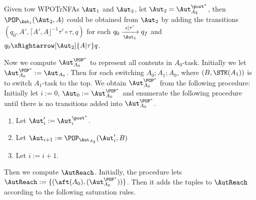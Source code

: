 \begin{theorem}
    Given tow WPOTrNFAs $\Aut_1$ and $\Aut_2$, 
let $\Aut_2 = \Aut_{A_2}^{\post^*}$, then $\POP_{\Aut_1}(\Aut_2,A)$ could be obtained from $\Aut_2$ by adding the transitions $(q_0,A',\lceil A',A\rfloor^{-1}\tau'\circ\tau,q)$ for each $q_0\xrightarrow[\Aut_1]{\epsilon | \tau'} q_f$ and $q_0\xRightarrow[\Aut_2]{A | \tau} q$.
\end{theorem}

Now we compute $\Aut_{A_0}^{\POP^*}$ to represent all contents in $A_0$-task. Initially we let $\Aut_{A_0}^{\POP^*} := \Aut_{A_0}$. Then for each switching $A_0;A_1;A_0$, where $(B,\STK(A_1))$ is to switch $A_1$-task to the top.
We obtain $\Aut_{A_0}^{\POP^*}$ from the following procedure:\\
Initially let $i := 0$, $\Aut_0 := \Aut_{A_0}^{\POP^*}$ and enumerate the following procedure until there is no transitions added into $\Aut_{A_0}^{\POP^*}$.
\begin{enumerate}
    \item Let $\Aut_i' := \Aut_i^{\post^*}$.
    \item Let $\Aut_{i+1} := \POP_{\Aut_{A_2}}(\Aut_i',B)$
    \item Let $i := i+1$.
\end{enumerate}
Then we compute $\AutReach$. Initially, the procedure lets $\AutReach := \{(\aft(A_0),(\Aut_{A_0}^{\POP^*}))\}$.
Then it adds the tuples to $\AutReach$ according to the following saturation rules.

